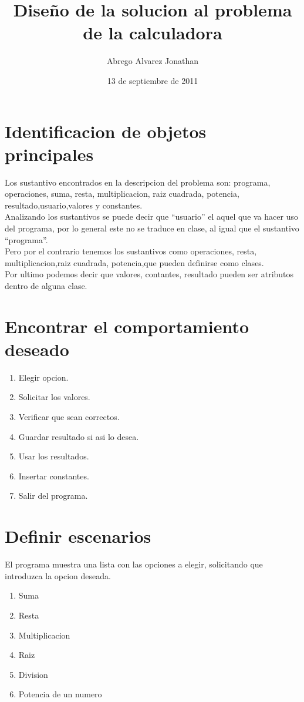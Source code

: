 \documentclass[a4paper,12pt]{article}
\begin{document}
\title{Diseño de la solucion al problema de la calculadora}
\author{Abrego Alvarez Jonathan}
\date{13 de septiembre de 2011}
\maketitle
   \section{Identificacion de objetos principales}
  Los sustantivo encontrados en la descripcion del problema son: programa, operaciones, suma, resta, multiplicacion, raiz cuadrada, potencia, resultado,usuario,valores y constantes.\\
   Analizando los sustantivos se puede decir que “usuario” el aquel que va hacer uso del programa, por lo general este no se traduce en clase, al igual que el sustantivo “programa”.\\
  Pero por el contrario tenemos los sustantivos como operaciones, resta, multiplicacion,raiz cuadrada, potencia,que pueden definirse como clases.\\
   Por ultimo podemos decir que valores, contantes, resultado pueden ser atributos dentro de alguna clase.
   \section{Encontrar el comportamiento deseado}
      \begin{enumerate}
         \item Elegir opcion. 
         \item Solicitar los valores.
         \item Verificar que sean correctos.
         \item Guardar resultado si asi lo desea.
         \item Usar los resultados. 
         \item Insertar constantes.
         \item Salir del programa. 
      \end{enumerate}
   \section{Definir escenarios}
   El programa muestra una lista con las opciones a elegir, solicitando que introduzca la opcion deseada.
   \begin{enumerate}
   \item Suma
   \item Resta
   \item Multiplicacion
   \item Raiz 
   \item Division
   \item Potencia de un numero
   \end{enumerate}
\end{document}
